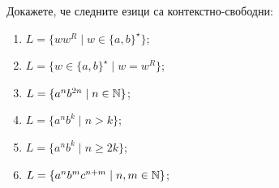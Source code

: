 \begin{problem}
  Докажете, че следните езици са контекстно-свободни:
  \begin{enumerate}[1)]
  \item
    $L = \{ww^R \mid w \in \{a,b\}^\star\}$;
  \item
    $L = \{w \in \{a,b\}^\star \mid w = w^R\}$;
  \item
    $L = \{a^nb^{2n} \mid n \in \mathbb{N}\}$;
  \item
    $L = \{a^nb^k \mid n > k\}$;
  \item
    $L = \{a^nb^k \mid n \geq 2k\}$;
  \item
    $L = \{a^nb^mc^{n+m}\mid n,m \in \mathbb{N}\}$;
  \end{enumerate}
\end{problem}
    

